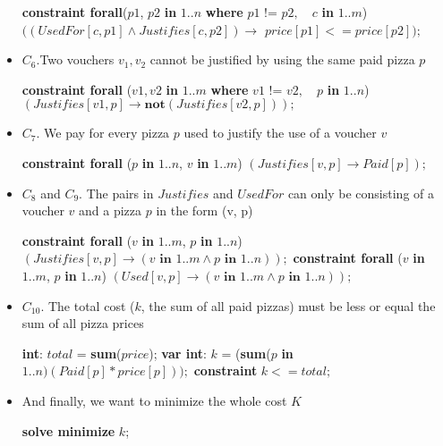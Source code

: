 \documentclass[conference]{IEEEtran}
\newcommand\tab[1][0.3cm]{\hspace*{#1}}
\begin{document}
\begin{itemize}
\begin{algorithmic}
\State \textbf{constraint forall}($p1$, $p2$ \textbf{in} $1..n$ \textbf{where} $p1 \text{ != } p2,$
\State \tab\tab\tab\tab\tab\tab\tab\tab $\text{ } c$ \textbf{in} $1..m$)
\State \tab\tab $((UsedFor[c, p1] \land Justifies[c, p2]) \rightarrow$
\State \tab\tab\tab\tab $price[p1] <= price[p2]);$
\\
\end{algorithmic}
\item $C_6$.Two vouchers $v_1, v_2$ cannot be justified by using the same paid pizza $p$
\begin{algorithmic}
\State \textbf{constraint forall} ($v1, v2$ \textbf{in} $1..m$ \textbf{where} $v1$ != $v2,$
\State \tab\tab\tab\tab\tab\tab\tab\tab $\text{ } p$ \textbf{in} $1..n$)
\State \tab\tab $(Justifies[v1, p] \rightarrow \textbf{not} (Justifies[v2, p]));$
\\
\end{algorithmic}
\item $C_7$. We pay for every pizza $p$ used to justify the use of a voucher $v$
\begin{algorithmic}
\State \textbf{constraint forall} ($p$ \textbf{in} $1..n$, $v$ \textbf{in} $1..m$)
\State \tab\tab $(Justifies[v, p] \rightarrow Paid[p]);$
\\
\end{algorithmic}
\item $C_8$ and $C_9$. The pairs in $Justifies$ and $UsedFor$ can only be consisting of a voucher $v$ and a pizza $p$ in the form (v, p)
\begin{algorithmic}
\State \textbf{constraint forall} ($v$ \textbf{in} $1..m$, $p$ \textbf{in} $1..n$)
\State \tab\tab $(Justifies[v, p] \rightarrow (v \textbf{ in } 1..m \land p \textbf{ in } 1..n));$
\State \textbf{constraint forall} ($v$ \textbf{in} $1..m$, $p$ \textbf{in} $1..n$)
\State \tab\tab $(Used[v, p] \rightarrow (v \textbf{ in } 1..m \land p \textbf{ in } 1..n));$
\\
\end{algorithmic}
\item $C_{10}$. The total cost ($k$, the sum of all paid pizzas) must be less or equal the sum of all pizza prices
\begin{algorithmic}
\State \textbf{int}: $total$ = \textbf{sum}($price$);
\State \textbf{var int}: $k$ = (\textbf{sum}($p$ \textbf{in} $1..n)(Paid[p] * price[p]));$
\State \textbf{constraint} $k <= total;$
\\
\end{algorithmic}
\item And finally, we want to minimize the whole cost $K$
\begin{algorithmic}
\State \textbf{solve minimize} $k$;
\\
\end{algorithmic}
\end{itemize}
\end{document}
